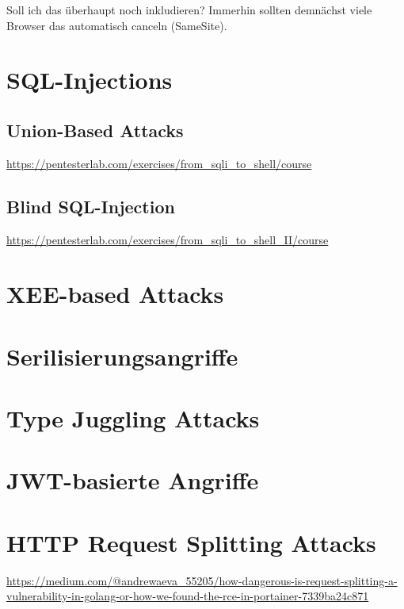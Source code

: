 Soll ich das überhaupt noch inkludieren? Immerhin sollten demnächst viele Browser das automatisch canceln (SameSite).

\chapter{SQL-Injections}

\section{Union-Based Attacks}

\url{https://pentesterlab.com/exercises/from_sqli_to_shell/course}

\section{Blind SQL-Injection}

\url{https://pentesterlab.com/exercises/from_sqli_to_shell_II/course}

\chapter{XEE-based Attacks}

\chapter{Serilisierungsangriffe}

\chapter{Type Juggling Attacks}

\chapter{JWT-basierte Angriffe}

\chapter{HTTP Request Splitting Attacks}

\url{https://medium.com/@andrewaeva_55205/how-dangerous-is-request-splitting-a-vulnerability-in-golang-or-how-we-found-the-rce-in-portainer-7339ba24c871}
